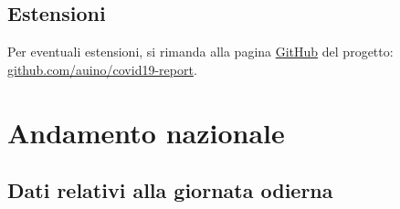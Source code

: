 \documentclass[12pt]{article}
\begin{document}
\subsection{Estensioni}

Per eventuali estensioni, si rimanda alla pagina \href{https://github.com}{GitHub} del progetto:\\
\href{https://github.com/auino/covid19-report}{github.com/auino/covid19-report}.

\newpage

\section{Andamento nazionale}

\subsection{Dati relativi alla giornata odierna}


\end{document}
